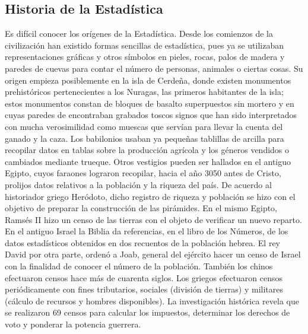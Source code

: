 \documentclass[a4paper]{report} %
\begin{document}
\subsection{Historia de la Estad\'istica}
Es dif\'icil conocer los or\'igenes de la Estad\'istica. Desde los comienzos de la civilizaci\'on han existido formas sencillas de estad\'istica, pues ya se utilizaban representaciones gr\'aficas y otros s\'imbolos en pieles, rocas, palos de madera y paredes de cuevas para contar el n\'umero de personas, animales o ciertas cosas. Su origen empieza posiblemente en la isla de Cerde\~na, donde existen monumentos prehist\'oricos pertenecientes a los Nuragas, las primeros habitantes de la isla; estos monumentos constan de bloques de basalto superpuestos sin mortero y en cuyas paredes de encontraban grabados toscos signos que han sido interpretados con mucha verosimilidad como muescas que serv\'ian para llevar la cuenta del ganado y la caza. Los babilonios usaban ya peque\~nas tablillas de arcilla para recopilar datos en tablas sobre la producci\'on agr\'icola y los g\'eneros vendidos o cambiados mediante trueque. Otros vestigios pueden ser hallados en el antiguo Egipto, cuyos faraones lograron recopilar, hacia el a\~no 3050 antes de Cristo, prolijos datos relativos a la poblaci\'on y la riqueza del pa\'is. De acuerdo al historiador griego Her\'odoto, dicho registro de riqueza y poblaci\'on se hizo con el objetivo de preparar la construcci\'on de las pir\'amides. En el mismo Egipto, Rams\'es II hizo un censo de las tierras con el objeto de verificar un nuevo reparto. En el antiguo Israel la Biblia da referencias, en el libro de los N\'umeros, de los datos estad\'isticos obtenidos en dos recuentos de la poblaci\'on hebrea. El rey David por otra parte, orden\'o a Joab, general del ej\'ercito hacer un censo de Israel con la finalidad de conocer el n\'umero de la poblaci\'on. Tambi\'en los chinos efectuaron censos hace m\'as de cuarenta siglos. Los griegos efectuaron censos peri\'odicamente con fines tributarios, sociales (divisi\'on de tierras) y militares (c\'alculo de recursos y hombres disponibles). La investigaci\'on hist\'orica revela que se realizaron 69 censos para calcular los impuestos, determinar los derechos de voto y ponderar la potencia guerrera. \medskip
\end{document}
